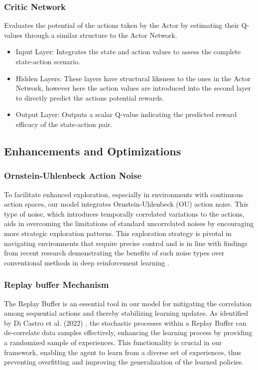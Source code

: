 \documentclass[conference]{IEEEtran}
\begin{document}
\subsubsection{Critic Network}
Evaluates the potential of the actions taken by the Actor by estimating their Q-values through a similar structure to the Actor Network\cite{sung2017learning}.
\begin{itemize}
    \item Input Layer: Integrates the state and action values to assess the complete state-action scenario.
    \item Hidden Layers: These layers have structural likeness to the ones in the Actor Network, however here the action values are introduced into the second layer to directly predict the actions potential rewards.
    \item Output Layer: Outputs a scalar Q-value indicating the predicted reward efficacy of the state-action pair.
\end{itemize}

\subsection{Enhancements and Optimizations}
\subsubsection{Ornstein-Uhlenbeck Action Noise}
To facilitate enhanced exploration, especially in environments with continuous action spaces, our model integrates Ornstein-Uhlenbeck (OU) action noise. This type of noise, which introduces temporally correlated variations to the actions, aids in overcoming the limitations of standard uncorrelated noises by encouraging more strategic exploration patterns. This exploration strategy is pivotal in navigating environments that require precise control and is in line with findings from recent research demonstrating the benefits of such noise types over conventional methods in deep reinforcement learning \cite{eberhard2022pink}.

\subsubsection{Replay buffer Mechanism}
The Replay Buffer is an essential tool in our model for mitigating the correlation among sequential actions and thereby stabilizing learning updates. As identified by Di Castro et al. (2022) \cite{di2022analysis}, the stochastic processes within a Replay Buffer can de-correlate data samples effectively, enhancing the learning process by providing a randomized sample of experiences. This functionality is crucial in our framework, enabling the agent to learn from a diverse set of experiences, thus preventing overfitting and improving the generalization of the learned policies.
\end{document}
